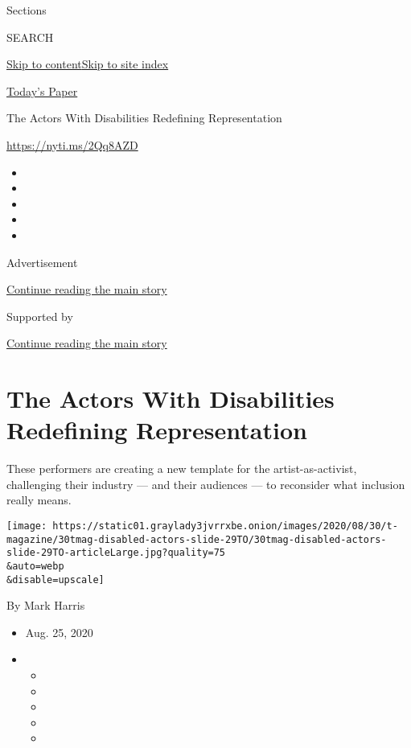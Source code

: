 Sections

SEARCH

\protect\hyperlink{site-content}{Skip to
content}\protect\hyperlink{site-index}{Skip to site index}

\href{https://myaccount.nytimes3xbfgragh.onion/auth/login?response_type=cookie\&client_id=vi}{}

\href{https://www.nytimes3xbfgragh.onion/section/todayspaper}{Today's
Paper}

The Actors With Disabilities Redefining Representation

\url{https://nyti.ms/2Qq8AZD}

\begin{itemize}
\item
\item
\item
\item
\item
\end{itemize}

Advertisement

\protect\hyperlink{after-top}{Continue reading the main story}

Supported by

\protect\hyperlink{after-sponsor}{Continue reading the main story}

\hypertarget{the-actors-with-disabilities-redefining-representation}{%
\section{The Actors With Disabilities Redefining
Representation}\label{the-actors-with-disabilities-redefining-representation}}

These performers are creating a new template for the artist-as-activist,
challenging their industry --- and their audiences --- to reconsider
what inclusion really means.

\texttt{[image: https://static01.graylady3jvrrxbe.onion/images/2020/08/30/t-magazine/30tmag-disabled-actors-slide-29TO/30tmag-disabled-actors-slide-29TO-articleLarge.jpg?quality=75\\\&auto=webp\\\&disable=upscale]}

By Mark Harris

\begin{itemize}
\item
  Aug. 25, 2020
\item
  \begin{itemize}
  \item
  \item
  \item
  \item
  \item
  \end{itemize}
\end{itemize}

